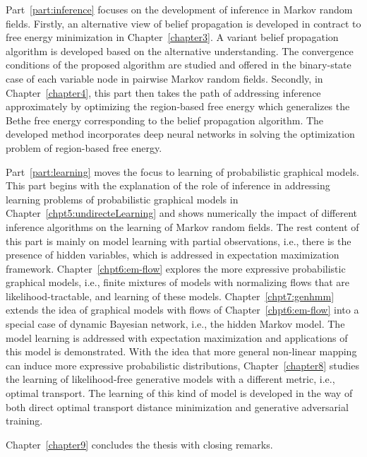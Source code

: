Part~\ref{part:inference} focuses on the development of inference in Markov random fields. Firstly, an alternative view of belief propagation is developed in contract to free energy minimization in Chapter~\ref{chapter3}. A variant belief propagation algorithm is developed based on the alternative understanding. The convergence conditions of the proposed algorithm are studied and offered in the binary-state case of each variable node in pairwise Markov random fields. Secondly, in Chapter~\ref{chapter4}, this part then takes the path of addressing inference approximately by optimizing the region-based free energy which generalizes the Bethe free energy corresponding to the belief propagation algorithm. The developed method incorporates deep neural networks in solving the optimization problem of region-based free energy.

Part~\ref{part:learning} moves the focus to learning of probabilistic graphical models. This part begins with the explanation of the role of inference in addressing learning problems of probabilistic graphical models in Chapter~\ref{chpt5:undirecteLearning} and shows numerically the impact of different inference algorithms on the learning of Markov random fields. The rest content of this part is mainly on model learning with partial observations, i.e., there is the presence of hidden variables, which is addressed in expectation maximization framework. Chapter~\ref{chpt6:em-flow} explores the more expressive probabilistic graphical models, i.e., finite mixtures of models with normalizing flows that are likelihood-tractable, and learning of these models. Chapter~\ref{chpt7:genhmm} extends the idea of graphical models with flows of Chapter~\ref{chpt6:em-flow} into a special case of dynamic Bayesian network, i.e., the hidden Markov model. The model learning is addressed with expectation maximization and applications of this model is demonstrated. With the idea that more general non-linear mapping can induce more expressive probabilistic distributions, Chapter~\ref{chapter8} studies the learning of likelihood-free generative models with a different metric, i.e., optimal transport. The learning of this kind of model is developed in the way of both direct optimal transport distance minimization and generative adversarial training.

Chapter~\ref{chapter9} concludes the thesis with closing remarks.

